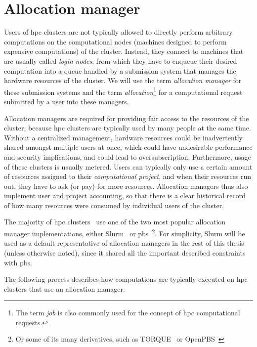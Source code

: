 
\section{Allocation manager}
\label{sec:allocation-manager}
Users of \gls{hpc} clusters are not typically allowed to directly perform
arbitrary computations on the computational nodes (machines designed to perform expensive
computations) of the cluster. Instead, they connect to machines that are usually called
\emph{login nodes}, from which they have to enqueue their desired computation into a queue
handled by a submission system that manages the hardware resources of the cluster. We will use the
term \emph{allocation manager} for these submission systems and the term
\emph{allocation}\footnote{The term \emph{job} is also commonly used for the concept of
\gls{hpc} computational requests.} for a computational request submitted by a
user into these managers.

Allocation managers are required for providing fair access to the resources of the cluster, because
\gls{hpc} clusters are typically used by many people at the same time. Without a
centralized management, hardware resources could be inadvertently shared amongst multiple users at
once, which could have undesirable performance and security implications, and could lead to
oversubscription. Furthermore, usage of these clusters is usually metered. Users can typically only
use a certain amount of resources assigned to their \emph{computational project}, and when their
resources run out, they have to ask (or pay) for more resources. Allocation managers thus also
implement user and project accounting, so that there is a clear historical record of how many
resources were consumed by individual users of the cluster.

The majority of \gls{hpc} clusters~\cite{slurm-schedmd} use one of the two
most popular allocation manager implementations, either Slurm~\cite{slurm} or
\gls{pbs}~\cite{pbs}\footnote{Or some of its many derivatives,
such as TORQUE~\cite{torque} or OpenPBS~\cite{openpbs}}. For simplicity,
Slurm will be used as a default representative of allocation managers in the rest of this thesis
(unless otherwise noted), since it shared all the important described constraints with
\gls{pbs}.

The following process describes how computations are typically executed on
\gls{hpc} clusters that use an allocation manager:

